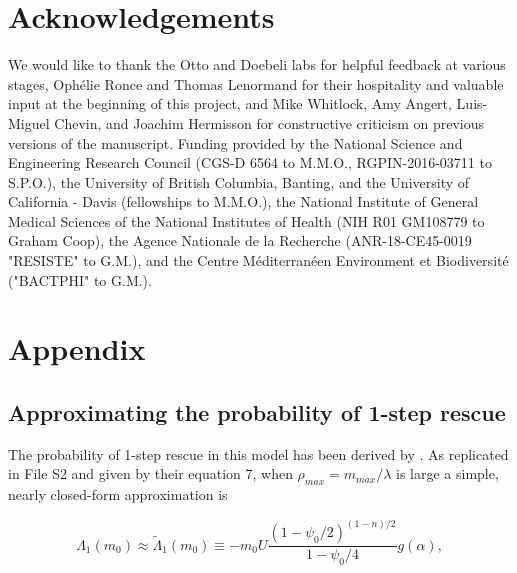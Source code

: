 \documentclass[9pt,twocolumn,twoside,lineno]{gsajnl}
\begin{document}
\section{Acknowledgements}

We would like to thank the Otto and Doebeli labs for helpful feedback at various stages, Oph\'{e}lie Ronce and Thomas Lenormand for their hospitality and valuable input at the beginning of this project, and Mike Whitlock, Amy Angert, Luis-Miguel Chevin, and Joachim Hermisson for constructive criticism on previous versions of the manuscript.
Funding provided by the National Science and Engineering Research Council (CGS-D 6564 to M.M.O., RGPIN-2016-03711 to S.P.O.), the University of British Columbia, Banting, and the University of California - Davis (fellowships to M.M.O.), the National Institute of General Medical Sciences of the National Institutes of Health (NIH R01 GM108779 to Graham Coop), the Agence Nationale de la Recherche (ANR-18-CE45-0019 "RESISTE" to G.M.), and the Centre M\'{e}diterran\'{e}en Environment et Biodiversit\'{e} ("BACTPHI" to G.M.).



\section{Appendix}
\label{sec:appendix}

\subsection{Approximating the probability of 1-step rescue}
\label{subsec:1stepApproximations}

The probability of 1-step rescue in this model has been derived by \cite{Anciaux2018}.
As replicated in File S2 and given by their equation 7, when $\rho_{max} = m_{max}/\lambda$ is large a simple, nearly closed-form approximation is

\begin{equation}\label{eq:p1closed}
\Lambda_1(m_0) \approx \tilde{\Lambda}_1(m_0) \equiv  -m_0 U \frac{(1-\psi_0/2)^{(1-n)/2}}{1-\psi_0/4} g(\alpha),
\end{equation}
\end{document}
